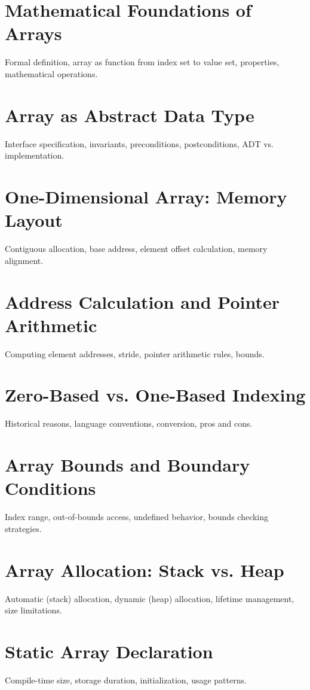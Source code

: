 
\chapter{Mathematical Foundations of Arrays}
Formal definition, array as function from index set to value set, properties, mathematical operations.

\chapter{Array as Abstract Data Type}
Interface specification, invariants, preconditions, postconditions, ADT vs. implementation.

\chapter{One-Dimensional Array: Memory Layout}
Contiguous allocation, base address, element offset calculation, memory alignment.

\chapter{Address Calculation and Pointer Arithmetic}
Computing element addresses, stride, pointer arithmetic rules, bounds.

\chapter{Zero-Based vs. One-Based Indexing}
Historical reasons, language conventions, conversion, pros and cons.

\chapter{Array Bounds and Boundary Conditions}
Index range, out-of-bounds access, undefined behavior, bounds checking strategies.

\chapter{Array Allocation: Stack vs. Heap}
Automatic (stack) allocation, dynamic (heap) allocation, lifetime management, size limitations.

\chapter{Static Array Declaration}
Compile-time size, storage duration, initialization, usage patterns.

